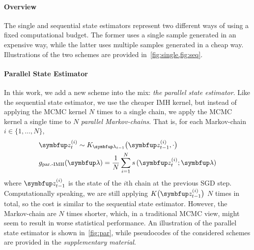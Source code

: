 
\paragraph{Overview}
The single and sequential state estimators represent two different ways of using a fixed computational budget.
The former uses a single sample generated in an expensive way, while the latter uses multiple samples generated in a cheap way.
Illustrations of the two schemes are provided in~\cref{fig:single,fig:seq}.

\vspace{-0.05in}
\paragraph{Parallel State Estimator}
In this work, we add a new scheme into the mix: \textit{the parallel state estimator}.
Like the sequential state estimator, we use the cheaper IMH kernel, but instead of applying the MCMC kernel \(N\) times to a single chain, we apply the MCMC kernel a single time to \(N\) \textit{parallel Markov-chains}.
That is, for each Markov-chain \(i \in \{1, \ldots, N\}\),
%
\vspace{-0.05in}
\begin{align*}
  &\vz_{t}^{(i)} \sim K_{\vlambda_{t-1}}\big(\vz_{t-1}^{(i)}, \cdot \big) \\
  &g_{\text{par.-IMH}}(\vlambda) = \frac{1}{N} \sum_{i=1}^N s\,(\vz_{t}^{(i)}; \vlambda)
\end{align*}
%
where \(\vz_{t-1}^{(i)}\) is the state of the \(i\)th chain at the previous SGD step.
Computationally speaking, we are still applying \(K\big(\vz_{t-1}^{(i)}\big)\) \(N\) times in total, so the cost is similar to the sequential state estimator.
However, the Markov-chain are \(N\) times shorter, which, in a traditional MCMC view, might seem to result in worse statistical performance.
An illustration of the parallel state estimator is shown in~\cref{fig:par}, while pseudocodes of the considered schemes are provided in the \textit{supplementary material}.

\vspace{-0.05in}
